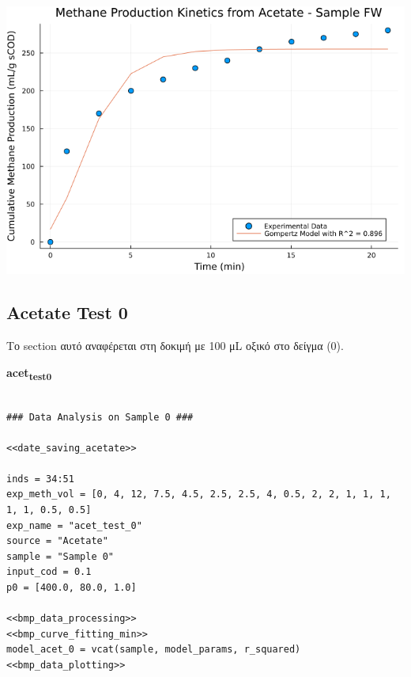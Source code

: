 \documentclass[11pt]{article}
\begin{document}
\begin{center}
\includegraphics[width=.9\linewidth]{../plots/BMPs/Acetate/methane_kinetics_acet_test_fw.png}
\end{center}

\subsection{Acetate Test 0}
\label{sec:orgc7418b0}
Το section αυτό αναφέρεται στη δοκιμή με 100 μL οξικό στο δείγμα (0).

\textbf{acet\textsubscript{test}\textsubscript{0}}
\begin{verbatim}

### Data Analysis on Sample 0 ###

<<date_saving_acetate>>

inds = 34:51
exp_meth_vol = [0, 4, 12, 7.5, 4.5, 2.5, 2.5, 4, 0.5, 2, 2, 1, 1, 1, 1, 1, 0.5, 0.5]
exp_name = "acet_test_0"
source = "Acetate"
sample = "Sample 0"
input_cod = 0.1
p0 = [400.0, 80.0, 1.0]

<<bmp_data_processing>>
<<bmp_curve_fitting_min>>
model_acet_0 = vcat(sample, model_params, r_squared)
<<bmp_data_plotting>>
\end{verbatim}
\end{document}
